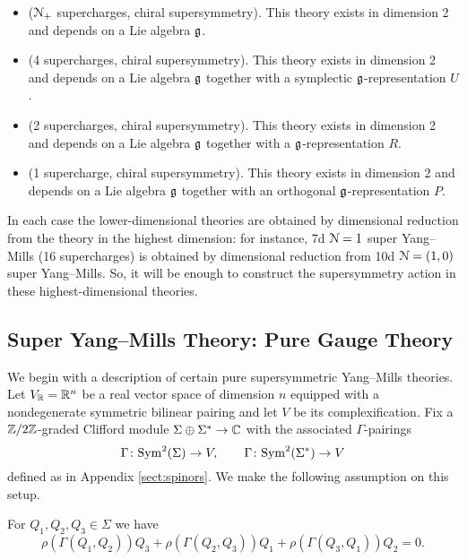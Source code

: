 \documentclass[10pt, oneside]{article}
\begin{document}
\begin{itemize}
\item ($\mathcal N_+$ supercharges, chiral supersymmetry). This theory exists in dimension 2 and depends on a Lie algebra $\mathfrak g$.

\item (4 supercharges, chiral supersymmetry). This theory exists in dimension 2 and depends on a Lie algebra $\mathfrak g$ together with a symplectic $\mathfrak g$-representation $U$.

\item (2 supercharges, chiral supersymmetry). This theory exists in dimension 2 and depends on a Lie algebra $\mathfrak g$ together with a $\mathfrak g$-representation $R$.

\item (1 supercharge, chiral supersymmetry). This theory exists in dimension 2 and depends on a Lie algebra $\mathfrak g$ together with an orthogonal $\mathfrak g$-representation $P$.
\end{itemize}

In each case the lower-dimensional theories are obtained by dimensional reduction from the theory in the highest dimension: for instance, 7d $\mathcal{N}=1$ super Yang--Mills (16 supercharges) is obtained by dimensional reduction from 10d $\mathcal{N}=(1, 0)$ super Yang--Mills. So, it will be enough to construct the supersymmetry action in these highest-dimensional theories.

\subsection{Super Yang--Mills Theory: Pure Gauge Theory}
\label{sect:gaugemultipletSUSY}

We begin with a description of certain pure supersymmetric Yang--Mills theories. Let $V_\mathbb R = \mathbb R^n$ be a real vector space of dimension $n$ equipped with a nondegenerate symmetric bilinear pairing and let $V$ be its complexification. 
Fix a $\mathbb Z/2\mathbb Z$-graded Clifford module $\Sigma\oplus \Sigma^*\rightarrow \mathbb C$ with the associated $\Gamma$-pairings
\[\Gamma\colon {\rm Sym}^2(\Sigma)\rightarrow V,\qquad \Gamma\colon {\rm Sym}^2(\Sigma^*)\rightarrow V\]
defined as in Appendix \ref{sect:spinors}. We make the following assumption on this setup.

\begin{assumption}
For $Q_1, Q_2, Q_3\in\Sigma$ we have
\[\rho(\Gamma(Q_1, Q_2))Q_3 + \rho(\Gamma(Q_2, Q_3))Q_1 + \rho(\Gamma(Q_3, Q_1))Q_2 = 0.\]
\label{assumption:3psi}
\end{assumption}
\end{document}
